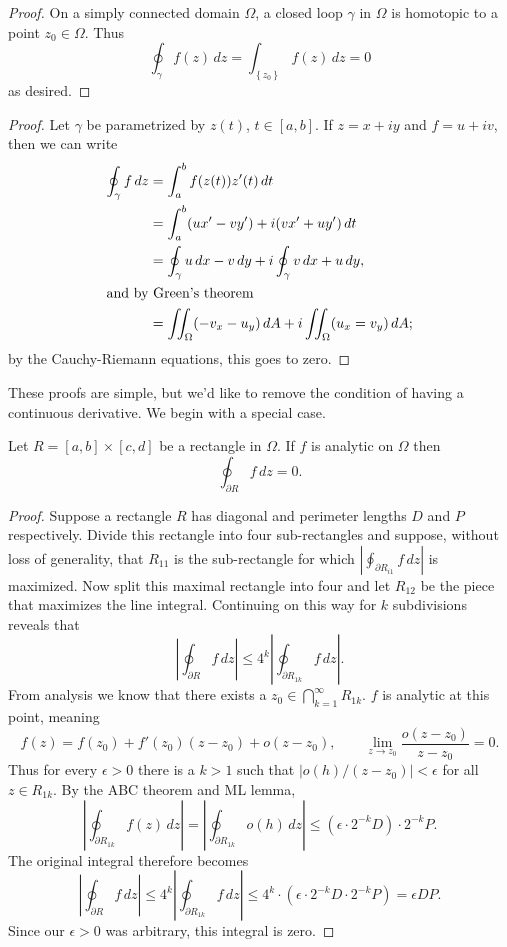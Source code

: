 \documentclass[../m136main.tex]{subfiles}
\begin{document}
\begin{proof}
    On a simply connected domain $\Omega$, a closed loop $\gamma$ in $\Omega$ is homotopic to a point $z_0 \in \Omega$.
    Thus
    \[ \oint_\gamma f(z) \,dz = \int_{\left\{ z_0 \right\}} f(z) \,dz = 0 \]
    as desired. 
\end{proof}

\begin{proof}
    Let $\gamma$ be parametrized by $z(t)$, $t \in [a,b]$.
    If $z = x + iy$ and $f = u + iv$, then we can write
    \begin{align*}
        \oint_\gamma f \,dz &= \int_a^b f(z(t)) z'(t) \,dt \\
        &= \int_a^b (ux' - vy') + i(vx' + uy') \,dt \\
        &= \oint_\gamma u \,dx - v \,dy + i \oint_\gamma v \,dx + u\,dy, \\
        \intertext{and by Green's theorem}
        &= \iint_\Omega (-v_x - u_y) \,dA + i \iint_\Omega (u_x = v_y) \,dA;
    \end{align*}
    by the Cauchy-Riemann equations, this goes to zero.
\end{proof}

These proofs are simple, but we'd like to remove the condition of having a continuous derivative.
We begin with a special case.

\begin{lemma}[]
    Let $R = [a,b] \times [c,d]$ be a rectangle in $\Omega$.
    If $f$ is analytic on $\Omega$ then
    \[ \oint_{\partial R} f \,dz = 0. \]
\end{lemma}

\begin{proof}
    Suppose a rectangle $R$ has diagonal and perimeter lengths $D$ and $P$ respectively.
    Divide this rectangle into four sub-rectangles and suppose, without loss of generality, that $R_{11}$ is the sub-rectangle for which $\left| \oint_{\partial R_{i1}} f \,dz \right|$ is maximized.
    Now split this maximal rectangle into four and let $R_{12}$ be the piece that maximizes the line integral.
    Continuing on this way for $k$ subdivisions reveals that
    \[ \left| \oint_{\partial R} f\,dz \right| \leq 4^{k} \left| \oint_{\partial R_{1k}} f\,dz \right|. \]
    From analysis we know that there exists a $z_0 \in \bigcap_{k=1}^\infty R_{1k}$.
    $f$ is analytic at this point, meaning
    \[ f(z) = f(z_0) + f'(z_0) (z - z_0) + o(z - z_0), \qquad \lim_{z \to z_0} \frac{o(z - z_0)}{z - z_0} = 0. \]
    Thus for every $\epsilon > 0$ there is a $k > 1$ such that $|o(h) / (z - z_0)| < \epsilon$ for all $z \in R_{1k}$.
    By the ABC theorem and ML lemma,
    \[ \left| \oint_{\partial R_{1k}} f(z) \,dz \right| = \left| \oint_{\partial R_{1k}} o(h) \,dz \right| \leq (\epsilon \cdot 2^{-k} D) \cdot 2^{-k} P. \]
    The original integral therefore becomes
    \[ \left| \oint_{\partial R} f\,dz \right| \leq 4^{k} \left| \oint_{\partial R_{1k}} f\,dz \right| \leq 4^{k} \cdot (\epsilon \cdot 2^{-k} D \cdot 2^{-k} P) = \epsilon DP. \]
    Since our $\epsilon > 0$ was arbitrary, this integral is zero.
\end{proof}
\end{document}
